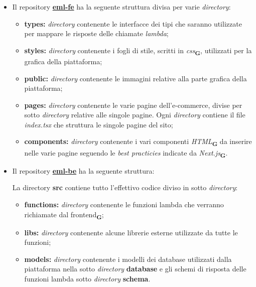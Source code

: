 \begin{itemize}
    \item Il repository \textbf{\href{https://github.com/techsweave/eml-fe.git}{eml-fe}} ha la seguente struttura divisa per varie \textit{directory}:
          \begin{itemize}
              \item \textbf{types:} \textit{directory} contenente le interfacce dei tipi che saranno utilizzate per mappare le risposte delle chiamate \textit{lambda};
              \item \textbf{styles:} \textit{directory} contenente i fogli di stile, scritti in \textit{css}\textsubscript{\textbf{G}}, utilizzati per la grafica della piattaforma;
              \item \textbf{public:} \textit{directory} contenente le immagini relative alla parte grafica della piattaforma;
              \item \textbf{pages:} \textit{directory} contenente le varie pagine dell'e-commerce, divise per sotto \textit{directory} relative alle singole pagine. Ogni \textit{directory} contiene il file \textit{index.tsx} che struttura le singole pagine del sito;
              \item \textbf{components:} \textit{directory} contenente i vari componenti \textit{HTML}\textsubscript{\textbf{G}} da inserire nelle varie pagine seguendo le \textit{best practicies} indicate da \textit{Next.js}\textsubscript{\textbf{G}}.
          \end{itemize}
    \item Il repository \textbf{\href{https://github.com/techsweave/eml-be.git}{eml-be}} ha la seguente struttura:

          La directory \textbf{src} contiene tutto l'effettivo codice diviso in sotto \textit{directory}:
          \begin{itemize}
              \item \textbf{functions:} \textit{directory} contenente le funzioni lambda che verranno richiamate dal frontend\textsubscript{\textbf{G}};
              \item \textbf{libs:} \textit{directory} contenente alcune librerie esterne utilizzate da tutte le funzioni;
              \item \textbf{models:} \textit{directory} contenente i modelli dei database utilizzati dalla piattaforma nella sotto \textit{directory} \textbf{database} e gli schemi di risposta delle funzioni lambda sotto \textit{directory} \textbf{schema}.
          \end{itemize}


\end{itemize}
